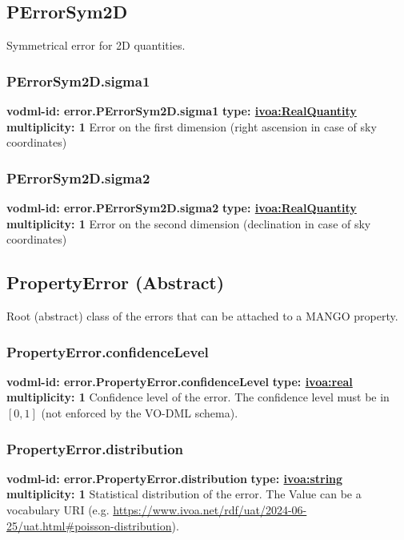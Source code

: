   \subsection{PErrorSym2D}
  \label{sect:error.PErrorSym2D}
    Symmetrical error for 2D quantities.

    \subsubsection{PErrorSym2D.sigma1}
      \textbf{vodml-id: error.PErrorSym2D.sigma1} \newline
      \textbf{type: \hyperref[sect:ivoa]{ivoa:RealQuantity}} \newline
      \textbf{multiplicity: 1} \newline
      Error on the first dimension (right ascension in case of sky coordinates)

    \subsubsection{PErrorSym2D.sigma2}
      \textbf{vodml-id: error.PErrorSym2D.sigma2} \newline
      \textbf{type: \hyperref[sect:ivoa]{ivoa:RealQuantity}} \newline
      \textbf{multiplicity: 1} \newline
      Error on the second dimension (declination in case of sky coordinates)

  \subsection{PropertyError (Abstract)}
  \label{sect:error.PropertyError}
    Root (abstract) class of the errors that can be attached to a MANGO property.

    \subsubsection{PropertyError.confidenceLevel}
      \textbf{vodml-id: error.PropertyError.confidenceLevel} \newline
      \textbf{type: \hyperref[sect:ivoa]{ivoa:real}} \newline
      \textbf{multiplicity: 1} \newline
      Confidence level of the error. The confidence level must be in $[0, 1]$ (not enforced by the VO-DML schema).

    \subsubsection{PropertyError.distribution}
      \textbf{vodml-id: error.PropertyError.distribution} \newline
      \textbf{type: \hyperref[sect:ivoa]{ivoa:string}} \newline
      \textbf{multiplicity: 1} \newline
      Statistical distribution of the error. The Value can be a vocabulary URI (e.g. \url{https://www.ivoa.net/rdf/uat/2024-06-25/uat.html#poisson-distribution}).

